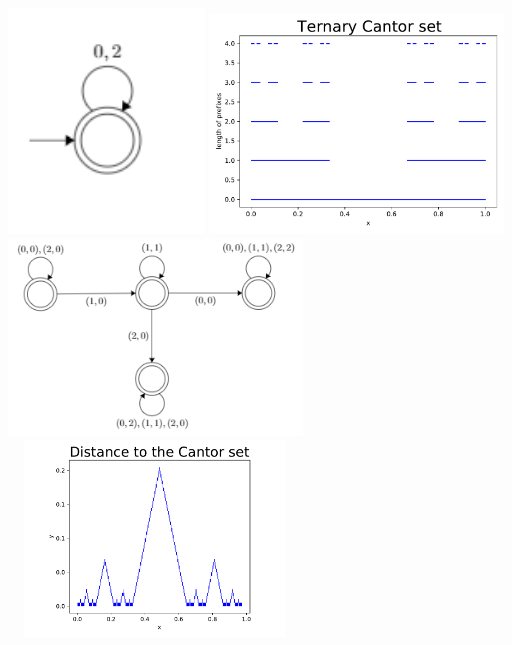 \documentclass[landscape,usenames,dvipsnames]{sciposter}
\begin{document}
\begin{multicols}{3}
\begin{center}
    \includegraphics[width=5.2cm]{FA20/images/fractals/cantor-automata.png}
    \includegraphics[width=7.8cm]{FA20/images/fractals/cantor3.pdf}
    \qquad
    \includegraphics[width=7.8cm]{FA20/images/fractals/cantord-automata.png}
    \includegraphics[width=7.8cm,height=5.2cm]{FA20/images/fractals/cantord.pdf}
\end{center}


\end{multicols}
\end{document}
